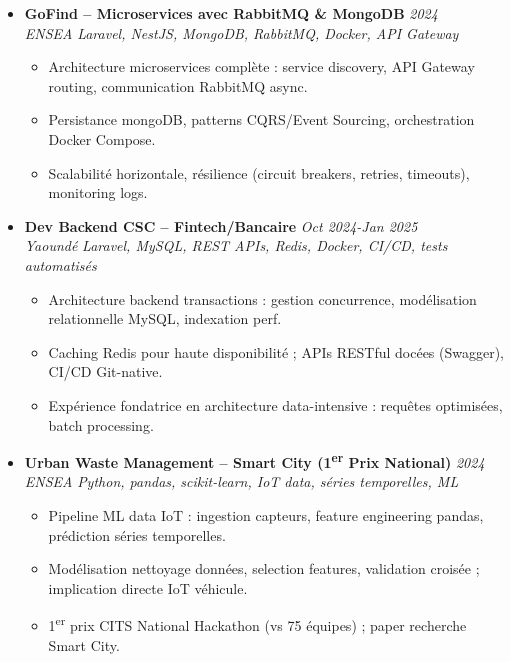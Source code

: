 \documentclass[a4paper,11pt]{article}
\begin{document}
\begin{itemize}[leftmargin=*, label=\tiny$\bullet$, nosep]
    \item \textbf{GoFind -- Microservices avec RabbitMQ \& MongoDB} \hfill \textit{2024} \\
    \textit{ENSEA} \hfill \textit{Laravel, NestJS, MongoDB, RabbitMQ, Docker, API Gateway}
    \vspace{-2pt}
    \begin{itemize}[leftmargin=0.4cm, nosep, label=\tiny$\bullet$]
        \item \small{Architecture microservices complète : service discovery, API Gateway routing, communication RabbitMQ async.}
        \item \small{Persistance mongoDB, patterns CQRS/Event Sourcing, orchestration Docker Compose.}
        \item \small{Scalabilit\'e horizontale, r\'esilience (circuit breakers, retries, timeouts), monitoring logs.}
    \end{itemize}
    \vspace{3pt}

    \item \textbf{Dev Backend CSC -- Fintech/Bancaire} \hfill \textit{Oct 2024-Jan 2025} \\
    \textit{Yaound\'e} \hfill \textit{Laravel, MySQL, REST APIs, Redis, Docker, CI/CD, tests automatis\'es}
    \vspace{-2pt}
    \begin{itemize}[leftmargin=0.4cm, nosep, label=\tiny$\bullet$]
        \item \small{Architecture backend transactions : gestion concurrence, mod\'elisation relationnelle MySQL, indexation perf.}
        \item \small{Caching Redis pour haute disponibilit\'e ; APIs RESTful doc\'ees (Swagger), CI/CD Git-native.}
        \item \small{Exp\'erience fondatrice en architecture data-intensive : requ\^etes optimis\'ees, batch processing.}
    \end{itemize}
    \vspace{3pt}

    \item \textbf{Urban Waste Management -- Smart City (1\textsuperscript{er} Prix National)} \hfill \textit{2024} \\
    \textit{ENSEA} \hfill \textit{Python, pandas, scikit-learn, IoT data, s\'eries temporelles, ML}
    \vspace{-2pt}
    \begin{itemize}[leftmargin=0.4cm, nosep, label=\tiny$\bullet$]
        \item \small{Pipeline ML data IoT : ingestion capteurs, feature engineering pandas, pr\'ediction s\'eries temporelles.}
        \item \small{Mod\'elisation nettoyage donn\'ees, selection features, validation crois\'ee ; implication directe IoT v\'ehicule.}
        \item \small{1\textsuperscript{er} prix CITS National Hackathon (vs 75 \'equipes) ; paper recherche Smart City.}
    \end{itemize}
    \vspace{3pt}


\end{itemize}
\end{document}
